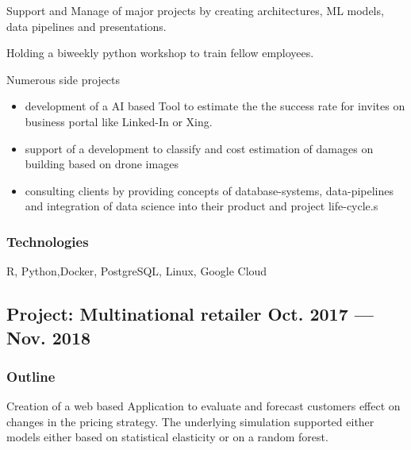 \documentclass[letter,10pt]{article}
\begin{document}
\begin{zitemize}
\item Support and Manage of major projects by creating architectures, ML models, data pipelines and presentations. \item Holding a biweekly python workshop to train fellow employees.  
\item Numerous side projects \begin{itemize}
	\item development of a AI based Tool to estimate the the success rate for invites on business portal like Linked-In or Xing.
	\item support of a development to classify and cost estimation of damages on building based on drone images
	\item consulting clients by providing concepts of database-systems, data-pipelines and integration of data science into their product and project life-cycle.s
\end{itemize}
\end{zitemize}

\subsubsection*{{Technologies}}
R, Python,Docker, PostgreSQL, Linux, Google Cloud

\vspace{1em}

\subsection{{Project: Multinational retailer  \hfill Oct.  2017 --- Nov. 2018 }}
\subsubsection*{{Outline}}
Creation of a web based Application to evaluate and forecast customers effect on changes in the pricing strategy. The underlying simulation supported either models either based on statistical elasticity or on a random forest. 
\end{document}
